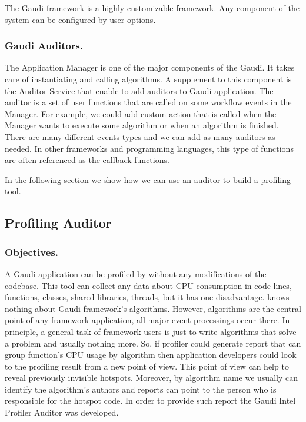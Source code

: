 \documentclass[a4paper]{jpconf}
\begin{document}
The Gaudi framework is a highly customizable framework. Any component of the system can be configured by user options. 

\subsubsection{Gaudi Auditors.}

The Application Manager is one of the major components of the Gaudi. It takes care of instantiating and
 calling algorithms. A supplement to this component  is the Auditor Service that enable to add auditors to 
 Gaudi application. The auditor is a set of user functions that are called on some workflow events in the Manager. 
 For example, we could add custom action that is called when the Manager wants to execute some algorithm or when 
 an algorithm is finished.  There are many different events types and we can add as many auditors as needed. 
 In other frameworks and programming languages, this type of functions are often referenced as the callback functions.

In the following section we show how we can use an auditor to build a profiling tool.

\subsection{Profiling Auditor}

\subsubsection{Objectives.}

A Gaudi application can be profiled by \amp  without any modifications of the codebase.  This tool can collect any data 
about CPU consumption in code lines, functions, classes, shared libraries, threads, but it has one disadvantage. 
\amp knows nothing about Gaudi framework’s algorithms. However, algorithms are the central point of any framework 
application, all major event processings occur there. In principle, a general task of framework users is just to write 
algorithms that solve a problem and usually nothing more. So, if profiler could generate report that can group 
function’s CPU usage by algorithm then application developers could look to the profiling result 
from a new point of view. This point of view can help to reveal previously invisible hotspots. Moreover, 
by algorithm name we usually can identify the algorithm’s authors and reports can point to the person who is 
responsible for the hotspot code. In order to provide such report the Gaudi Intel Profiler Auditor was developed.
\end{document}

